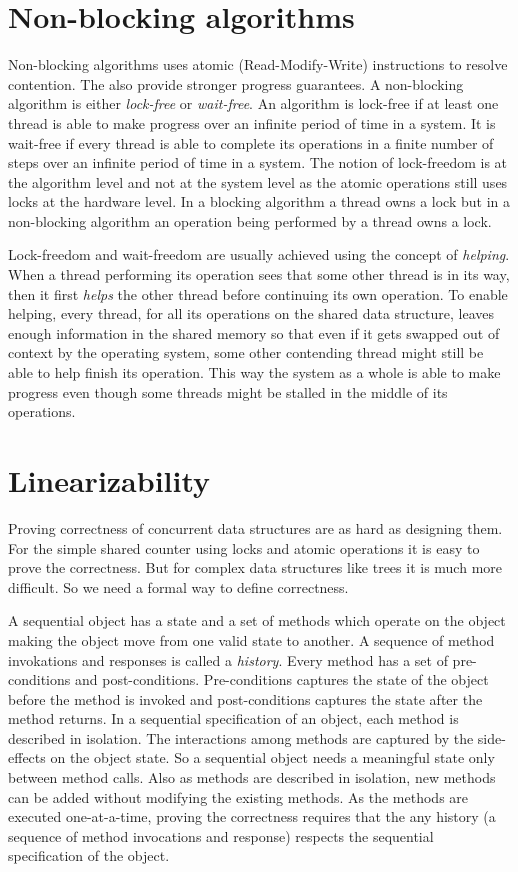 \section{Non-blocking algorithms}
Non-blocking algorithms uses atomic (Read-Modify-Write) instructions to resolve contention. The also provide stronger progress guarantees. A non-blocking algorithm is either \emph{lock-free} or \emph{wait-free}. An algorithm is lock-free if at least one thread is able to make progress over an infinite period of time in a system. It is wait-free if every thread is able to complete its operations in a finite number of steps over an infinite period of time in a system. The notion of lock-freedom is at the algorithm level and not at the system level as the atomic operations still uses locks at the hardware level. In a blocking algorithm a thread owns a lock but in a non-blocking algorithm an operation being performed by a thread owns a lock.

Lock-freedom and wait-freedom are usually achieved using the concept of \emph{helping}. When a thread performing its operation sees that some other thread is in its way,  then it first \emph{helps} the other thread before continuing its own operation. To enable helping, every thread, for all its operations on the shared data structure, leaves enough information in the shared memory so that even if it gets swapped out of context by the operating system, some other contending thread might still be able to help finish its operation. This way the system as a whole is able to make progress even though some threads might be stalled in the middle of its operations.

\section{Linearizability}
Proving correctness of concurrent data structures are as hard as designing them. For the simple shared counter using locks and atomic operations it is easy to prove the correctness. But for complex data structures like trees it is much more difficult. So we need a formal way to define correctness. 

A sequential object has a state and a set of methods which operate on the object making the object move from one valid state to another. A sequence of method invokations and responses is called a \emph{history}. Every method has a set of pre-conditions and post-conditions. Pre-conditions captures the state of the object before the method is invoked and post-conditions captures the state after the method returns. In a sequential specification of an object, each method is described in isolation. The interactions among methods are captured by the side-effects on the object state. So a sequential object needs a meaningful state only between method calls. Also as methods are described in isolation, new methods can be added without modifying the existing methods. As the methods are executed one-at-a-time, proving the correctness requires that the any history (a sequence of method invocations and response) respects the sequential specification of the object.

